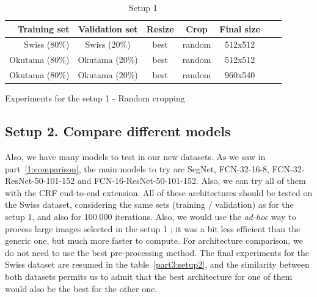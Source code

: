 \begin{table}[ht!]
  
  \begin{subtable}{\textwidth}
    \centering
    \begin{tabular}{rcccccc}
    \rowcolor{gray!50}
    \toprule
    \textbf{Training set} & \textbf{Validation set} & \textbf{Resize} & \textbf{Crop} & \textbf{Final size}\\
    \midrule
	Swiss (80\%)     & Swiss (20\%)       & best           & random         & 512x512		 \\
    \midrule
	Okutama (80\%)   & Okutama (20\%)     & best           & random         & 512x512			 \\
	Okutama (80\%)   & Okutama (20\%)     & best           & random         & 960x540			 \\
    \bottomrule
    \end{tabular}%
    \caption{Experiments for the setup 1 - Random cropping}
    \label{part3:setup1:randomcrop}
  \end{subtable}
  
  \caption{Setup 1}
  \label{part3:setup1}
\end{table}%


\subsection*{Setup 2. Compare different models}
Also, we have many models to test in our new datasets. As we saw in part~\ref{1:comparison}, the main models to try are SegNet, FCN-32-16-8, FCN-32-ResNet-50-101-152 and FCN-16-ResNet-50-101-152. Also, we can try all of them with the CRF end-to-end extension. All of these architectures should be tested on the Swiss dataset, considering the same sets (training / validation) as for the setup 1, and also for 100.000 iterations. Also, we would use the \textit{ad-hoc} way to process large images selected in the setup 1 ; it was a bit less efficient than the generic one, but much more faster to compute. For architecture comparison, we do not need to use the best pre-processing method. The final experiments for the Swiss dataset are resumed in the table~\ref{part3:setup2}, and the similarity between both datasets permits us to admit that the best architecture for one of them would also be the best for the other one.

